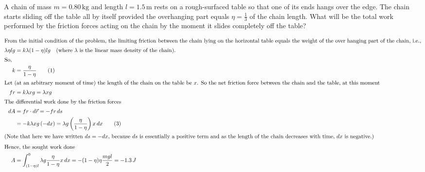 \item A chain of mass \( m = 0.80 \, \text{kg} \) and length \( l = 1.5 \, \text{m} \) rests on a rough-surfaced table so that one of its ends hangs over the edge. The chain starts sliding off the table all by itself provided the overhanging part equals \( \eta = \frac{1}{3} \) of the chain length. What will be the total work performed by the friction forces acting on the chain by the moment it slides completely off the table?\begin{solution}
    \begin{center}
    \end{center}
    
    \begin{align*}
        \intertext{From the initial condition of the problem, the limiting friction between the chain lying on the horizontal table equals the weight of the over hanging part of the chain, i.e.,}
        \lambda \eta lg &= k \lambda (1 - \eta) lg \quad (\text{where } \lambda \text{ is the linear mass density of the chain}).\\
        \intertext{So,}
        k &= \dfrac{\eta}{1 - \eta} \tag{1}\\
        \intertext{Let (at an arbitrary moment of time) the length of the chain on the table be $x$. So the net friction force between the chain and the table, at this moment}
        fr &= k \lambda x g = \lambda x g\\
        \intertext{The differential work done by the friction forces}
        dA &= fr \cdot d\vec{r} = - fr \, ds\\
        &= -k \lambda x g \, (-dx) = \lambda g \left( \dfrac{\eta}{1 - \eta} \right) x \, dx \tag{3}\\
        \intertext{(Note that here we have written $ds = -dx$, because $ds$ is essentially a positive term and as the length of the chain decreases with time, $dx$ is negative.)}
        \intertext{Hence, the sought work done}
        A &= \int_{(1 - \eta) l}^{0} \lambda g \dfrac{\eta}{1 - \eta} x \, dx = -(1 - \eta)\eta \dfrac{mgl}{2} = -1.3 \, J
    \end{align*}
\end{solution}
